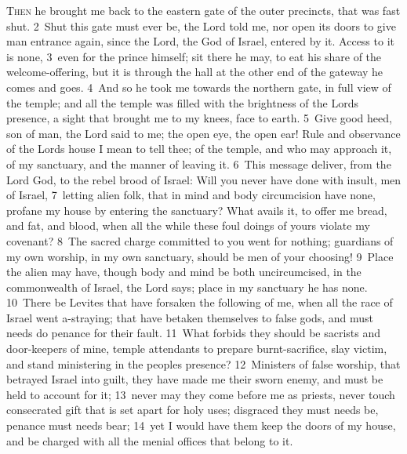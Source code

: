 \documentclass[10pt]{book} %
\begin{document}
\lettrine[lines=2]{T}{hen} he brought me back to the eastern gate of the outer precincts, that was fast shut. \textcolor{benred8}{2}~Shut this gate must ever be, the Lord told me, nor open its doors to give man entrance again, since the Lord, the God of Israel, entered by it. Access to it is none, \textcolor{benred8}{3}~even for the prince himself; sit there he may, to eat his share of the welcome-offering, but it is through the hall at the other end of the gateway he comes and goes.
\textcolor{benred8}{4}~And so he took me towards the northern gate, in full view of the temple; and all the temple was filled with the brightness of the Lord\textquotesingle s presence, a sight that brought me to my knees, face to earth. \textcolor{benred8}{5}~Give good heed, son of man, the Lord said to me; the open eye, the open ear! Rule and observance of the Lord\textquotesingle s house I mean to tell thee; of the temple, and who may approach it, of my sanctuary, and the manner of leaving it.
\textcolor{benred8}{6}~This message deliver, from the Lord God, to the rebel brood of Israel: Will you never have done with insult, men of Israel, \textcolor{benred8}{7}~letting alien folk, that in mind and body circumcision have none, profane my house by entering the sanctuary? What avails it, to offer me bread, and fat, and blood, when all the while these foul doings of yours violate my covenant? \textcolor{benred8}{8}~The sacred charge committed to you went for nothing; guardians of my own worship, in my own sanctuary, should be men of your choosing! \textcolor{benred8}{9}~Place the alien may have, though body and mind be both uncircumcised, in the commonwealth of Israel, the Lord says; place in my sanctuary he has none. \textcolor{benred8}{10}~There be Levites that have forsaken the following of me, when all the race of Israel went a-straying; that have betaken themselves to false gods, and must needs do penance for their fault. \textcolor{benred8}{11}~What forbids they should be sacrists and door-keepers of mine, temple attendants to prepare burnt-sacrifice, slay victim, and stand ministering in the people\textquotesingle s presence? \textcolor{benred8}{12}~Ministers of false worship, that betrayed Israel into guilt, they have made me their sworn enemy, and must be held to account for it; \textcolor{benred8}{13}~never may they come before me as priests, never touch consecrated gift that is set apart for holy uses; disgraced they must needs be, penance must needs bear; \textcolor{benred8}{14}~yet I would have them keep the doors of my house, and be charged with all the menial offices that belong to it.
\end{document}
